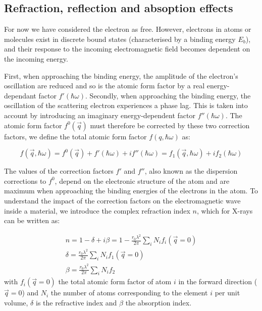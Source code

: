 \subsection{Refraction, reflection and absoption effects}

For now we have considered the electron as free.
However, electrons in atoms or molecules exist in discrete bound states (characterised by a binding energy $E_b$), and their response to the incoming electromagnetic field becomes dependent on the incoming energy.

First, when approaching the binding energy, the amplitude of the electron's oscillation are reduced and so is the atomic form factor by a real energy-dependant factor $f'(\hbar\omega)$.
Secondly, when approaching the binding energy, the oscillation of the scattering electron experiences a phase lag.
This is taken into account by introducing an imaginary energy-dependent factor $f''(\hbar\omega)$.
The atomic form factor $f^0(\vec{q})$ must therefore be corrected by these two correction factors, we define the total atomic form factor $f(q, \hbar\omega)$ as:

\begin{equation}
    f(\vec{q}, \hbar\omega) = f^0(\vec{q}) + f'(\hbar\omega) + if''(\hbar\omega) = f_1(\vec{q}, \hbar\omega) + i f_2(\hbar\omega)
\end{equation}

The values of the correction factors $f'$ and $f''$, also known as the dispersion corrections to $f^0$, depend on the electronic structure of the atom and are maximum when approaching the binding energies of the electrons in the atom.
To understand the impact of the correction factors on the electromagnetic wave inside a material, we introduce the complex refraction index $n$, which for X-rays can be written as:

\begin{gather}
    n = 1-\delta+i\beta = 1 - \frac{r_0 \lambda^2}{2\pi} \sum_i N_i f_i(\vec{q}=0)\\
    \label{eq:delta}
    \delta = \frac{r_0 \lambda^2}{2\pi} \sum_i N_i f_1(\vec{q}=0)\\
    \beta = \frac{r_0 \lambda^2}{2\pi} \sum_i N_i f_2
\end{gather}
with $f_i(\vec{q}=0)$ the total atomic form factor of atom $i$ in the forward direction ($\vec{q}=0$) and $N_i$ the number of atoms corresponding to the element $i$ per unit volume, $\delta$ is the refractive index and $\beta$ the absorption index.

